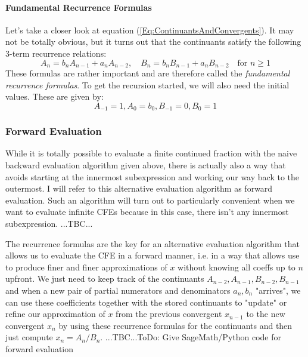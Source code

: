 \paragraph{Fundamental Recurrence Formulas}
Let's take a closer look at equation (\ref{Eq:ContinuantsAndConvergents}). It may not be totally obvious, but it turns out that the continuants satisfy the following 3-term recurrence relations:
\begin{equation}
A_n = b_n A_{n-1} + a_n A_{n-2}, \quad
B_n = b_n B_{n-1} + a_n B_{n-2}  \quad
\text{for }  n \geq 1
\end{equation}
These formulas are rather important and are therefore called the \emph{fundamental recurrence formulas}.
To get the recursion started, we will also need the initial values. These are given by:
\begin{equation}
A_{-1} = 1, A_0 = b_0, B_{-1} = 0, B_0 = 1
\end{equation}




\subsubsection{Forward Evaluation}
While it is totally possible to evaluate a finite continued fraction with the naive backward evaluation algorithm given above, there is actually also a way that avoids starting at the innermost subexpression and working our way back to the outermost. I will refer to this alternative evaluation algorithm as forward evaluation. Such an algorithm will turn out to particularly convenient when we want to evaluate infinite CFEs because in this case, there isn't any innermost subexpression. ...TBC...





The recurrence formulas are the key for an alternative evaluation algorithm that allows us to evaluate the CFE in a forward manner, i.e. in a way that allows use to produce finer and finer approximations of $x$ without knowing all coeffs up to $n$ upfront. We just need to keep track of the continuants $A_{n-2}, A_{n-1}, B_{n-2}, B_{n-1}$ and when a new pair of partial numerators and denominators $a_n, b_n$ "arrives", we can use these coefficients together with the stored continuants to "update" or refine our approximation of $x$ from the previous convergent $x_{n-1}$ to the new convergent $x_n$ by using these recurrence formulas for the continuants and then just compute $x_n = A_n/B_n$. ...TBC...ToDo: Give SageMath/Python code for forward evaluation


